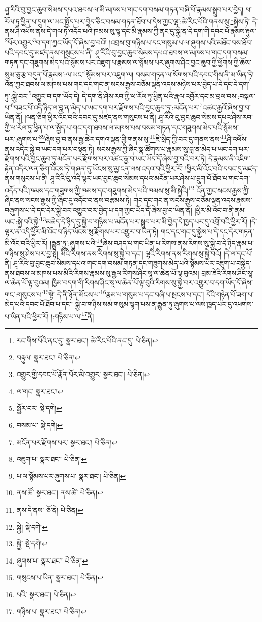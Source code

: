 ཤཱ་རིའི་བུ་བྱང་ཆུབ་སེམས་དཔའ་ཐབས་ལ་མི་མཁས་པ་གང་དག་བསམ་གཏན་བཞི་པོ་རྣམས་སྒྲུབ་པར་བྱེད། ཕ་རོལ་ཏུ་ཕྱིན་པ་དྲུག་ལ་ཡང་སྤྱོད་པར་བྱེད་ཅིང་བསམ་གཏན་ཐོབ་པ་དེས་ཀྱང་ལྷ་:ཚེ་རིང་པོའི་གནས་སུ་\footnote{རང་གིས་པོའི་ནང་དུ་  སྣར་ཐང་། ཚེ་རིང་པོའི་ནང་དུ་  པེ་ཅིན། }སྐྱེས་ཏེ། དེ་ནས་ཤི་འཕོས་ནས་དེ་གལ་ཏེ་འདོད་པའི་ཁམས་སུ་ལྷ་དང་མི་རྣམས་ཀྱི་ནང་དུ་སྐྱེ་ན་དེ་དག་གི་དབང་པོ་རྣམས་རྟུལ་\footnote{བརྟུལ་  སྣར་ཐང་།  པེ་ཅིན། }པོར་འགྱུར་\footnote{འགྱུར་གྱི་དབང་པོ་རྣོན་པོར་མི་འགྱུར་  སྣར་ཐང་།  པེ་ཅིན། }བ་དག་ཀྱང་ཡོད་དོ་ཞེས་བྱ་བའོ། །འབྲས་བུ་གཉིས་པ་དང་གསུམ་པ་ལ་ཞུགས་པའི་མཐོང་བས་ཐོབ་པའི་དབང་དུ་མཛད་ནས་གསུངས་པ་ནི། ཤཱ་རིའི་བུ་བྱང་ཆུབ་སེམས་དཔའ་ཐབས་ལ་མཁས་པ་གང་དག་བསམ་གཏན་དང་གཟུགས་མེད་པའི་སྙོམས་པར་འཇུག་པ་རྣམས་ལ་སྙོམས་པར་ཞུགས་ཤིང་བྱང་ཆུབ་ཀྱི་ཕྱོགས་ཀྱི་ཆོས་སུམ་ཅུ་རྩ་བདུན་པོ་རྣམས་:ལ་ཡང་\footnote{ལ་གང་  སྣར་ཐང་། }སྙོམས་པར་འཇུག་ལ། བསམ་གཏན་ལ་སོགས་པའི་དབང་གིས་ནི་མ་ཡིན་ཏེ། འོན་ཀྱང་ཐབས་ལ་མཁས་པས་གང་དང་གང་ན་སངས་རྒྱས་བཅོམ་ལྡན་འདས་མཉེས་པར་བྱེད་པ་དེ་དང་དེ་དག་ཏུ་:སྐྱེ་བར་\footnote{སྦྱོར་བར་  སྡེ་དགེ། }འགྱུར་བ་དག་ཡོད་དེ། དེ་དག་ནི་ཤེས་རབ་ཀྱི་ཕ་རོལ་ཏུ་ཕྱིན་པའི་རྣལ་འབྱོར་དང་མ་བྲལ་བས་:བསྐལ་པ་\footnote{བསམ་པ་  སྡེ་དགེ། }བཟང་པོ་འདི་ཉིད་ལ་བླ་ན་མེད་པ་ཡང་དག་པར་རྫོགས་པའི་བྱང་ཆུབ་ཏུ་:མངོན་པར་\footnote{མངོན་པར་རྫོགས་པར་  སྣར་ཐང་།  པེ་ཅིན། }འཚང་རྒྱའོ་ཞེས་བྱ་བ་ཡིན་ནོ། །ལན་ཅིག་ཕྱིར་འོང་བའི་དབང་དུ་མཛད་ནས་གསུངས་པ་ནི། ཤཱ་རིའི་བུ་བྱང་ཆུབ་སེམས་དཔའ་ཤེས་རབ་ཀྱི་ཕ་རོལ་ཏུ་ཕྱིན་པ་ལ་སྤྱོད་པ་གང་དག་ཐབས་ལ་མཁས་པས་བསམ་གཏན་དང་གཟུགས་མེད་པའི་སྙོམས་པར་:ཞུགས་པ་\footnote{འཇུག་པ་  སྣར་ཐང་།  པེ་ཅིན། }\footnote{པ་ལ་སྙོམས་པར་ཞུགས་པ་  སྣར་ཐང་།  པེ་ཅིན། }ཞེས་བྱ་བ་ནས་རྒྱ་ཆེར་དགའ་ལྡན་གྱི་གནས་སུ་\footnote{ནས་ཚོ་  སྣར་ཐང་། ནས་ཚེ་  པེ་ཅིན། }ཇི་སྲིད་ཀྱི་བར་དུ་གནས་ནས་\footnote{ནས་དེ་ནས་  ཅོ་ནེ།  པེ་ཅིན། }ཤི་འཕོས་ནས་འདིར་སྐྱེ་བ་ཡང་དག་པར་བསྟན་ཏེ། སངས་རྒྱས་ཀྱི་ཞིང་སྣ་ཚོགས་པ་རྣམས་སུ་བླ་ན་མེད་པ་ཡང་དག་པར་རྫོགས་པའི་བྱང་ཆུབ་ཏུ་མངོན་པར་རྫོགས་པར་འཚང་རྒྱ་བ་ཡང་ཡོད་དོ་ཞེས་བྱ་བའི་བར་ཏེ། དེ་རྣམས་ནི་འཇིག་རྟེན་འདིར་ལན་ཅིག་འོངས་ཏེ་གཞན་དུ་ཡོངས་སུ་མྱ་ངན་ལས་འདའ་བའི་ཕྱིར་རོ། །ཕྱིར་མི་འོང་བའི་དབང་དུ་མཛད་ནས་གསུངས་པ་ནི། ཤཱ་རིའི་བུ་འདི་ལྟར་ཡང་བྱང་ཆུབ་སེམས་དཔའ་མངོན་པར་ཤེས་པ་དྲུག་པོ་ཐོབ་པ་གང་དག་འདོད་པའི་ཁམས་དང་གཟུགས་ཀྱི་ཁམས་དང་གཟུགས་མེད་པའི་ཁམས་སུ་མི་སྐྱེའི།\footnote{སྐྱེ།  སྡེ་དགེ། } འོན་ཀྱང་སངས་རྒྱས་ཀྱི་ཞིང་ནས་སངས་རྒྱས་ཀྱི་ཞིང་དུ་འདོང་བ་ནས་བརྩམས་ཏེ། གང་དང་གང་ན་སངས་རྒྱས་བཅོམ་ལྡན་འདས་རྣམས་བཞུགས་པ་དེ་དང་དེར་སྐྱེ་བར་འགྱུར་བར་བྱེད་པ་དག་ཀྱང་ཡོད་དོ་ཞེས་བྱ་བ་ཡིན་ནོ། །ཕྱིར་མི་འོང་བ་ནི་ནམ་ཡང་:སྐྱེ་བའི་སྐྱེ་\footnote{སྐྱེ་  སྡེ་དགེ། }མཆེད་དེ་ཉིད་དུ་སྐྱེ་བ་གཉིས་པ་མངོན་པར་སྒྲུབ་པར་མི་བྱེད་དེ་ཁྱད་པར་དུ་འགྲོ་བའི་ཕྱིར་རོ། །དེ་ལྟར་ན་འདི་ཕྱིར་མི་འོང་བ་ཉིད་ཡོངས་སུ་རྫོགས་པར་འགྱུར་བ་ཡིན་ཏེ། གང་དང་གང་དུ་སྐྱེས་པ་དེ་དང་དེར་གཏན་མི་འོང་བའི་ཕྱིར་རོ། །རྒྱུན་ཏུ་:ཞུགས་པའི་\footnote{ཞུགས་པ་  སྣར་ཐང་།  པེ་ཅིན། }ཞེས་བཤད་པ་གང་ཡིན་པ་རིགས་ནས་རིགས་སུ་སྐྱེ་བ་དེ་ཉིད་རྣམ་པ་གཉིས་སུ་ཤེས་པར་བྱ་སྟེ། མིའི་རིགས་ནས་རིགས་སུ་སྐྱེ་བ་དང་། ལྷའི་རིགས་ནས་རིགས་སུ་སྐྱེ་བའོ། །དེ་ལ་དང་པོ་ནི། ཤཱ་རིའི་བུ་བྱང་ཆུབ་སེམས་དཔའ་གང་དག་བསམ་གཏན་དང་གཟུགས་མེད་པའི་སྙོམས་པར་འཇུག་པ་བསྐྱེད་ནས་ཐབས་ལ་མཁས་པས་མིའི་རིགས་རྣམས་སུ་རྒྱལ་རིགས་ཤིང་སཱ་ལ་ཆེན་པོ་ལྟ་བུའམ། བྲམ་ཟེའི་རིགས་ཤིང་སཱ་ལ་ཆེན་པོ་ལྟ་བུའམ། ཁྱིམ་བདག་གི་རིགས་ཤིང་སཱ་ལ་ཆེན་པོ་ལྟ་བུའི་རིགས་སུ་སྐྱེ་བར་འགྱུར་བ་དག་ཡོད་དོ་ཞེས་གང་:གསུངས་པ་\footnote{གསུངས་པ་ཡིན་  སྣར་ཐང་།  པེ་ཅིན། }སྟེ། དེ་ནི་ཉོན་མོངས་པ་\footnote{པའི་  སྣར་ཐང་།  པེ་ཅིན། }རྣམ་པ་གསུམ་པ་དང་བཞི་པ་སྤངས་པ་དང་། དེའི་གཉེན་པོ་ཟག་པ་མེད་པའི་དབང་པོ་ཐོབ་པ་དང་། སྐྱེ་བ་གཉིས་སམ་གསུམ་ལྷག་པས་ན་རྒྱུན་ཏུ་ཞུགས་པ་ལས་ཁྱད་པར་དུ་འཕགས་པ་ཡིན་པའི་ཕྱིར་རོ། །:གཉིས་པ་ལ་\footnote{གཉིས་པ་  སྣར་ཐང་།  པེ་ཅིན། }ནི། 